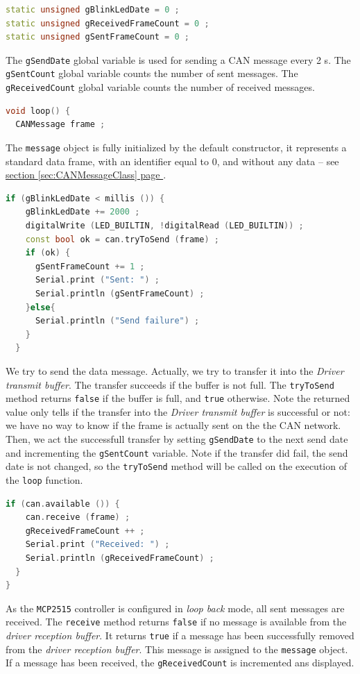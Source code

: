 \documentclass[10pt, a4paper, obeyspaces, openany]{extarticle}
\newcommand\refSectionPage[1]{\hyperref[sec:#1]{section \ref*{sec:#1} page \pageref{sec:#1}}}
\begin{document}
{ \small\begin{lstlisting}[language=c++]
static unsigned gBlinkLedDate = 0 ;
static unsigned gReceivedFrameCount = 0 ;
static unsigned gSentFrameCount = 0 ;
\end{lstlisting}}
The \texttt{gSendDate} global variable is used for sending a CAN message every 2 s. The \texttt{gSentCount} global variable counts the number of sent messages. The \texttt{gReceivedCount} global variable counts the number of received messages.



{ \small\begin{lstlisting}[language=c++]
void loop() {
  CANMessage frame ;
\end{lstlisting}}
The \texttt{message} object is fully initialized by the default constructor, it represents a standard data frame, with an identifier equal to $0$, and without any data -- see \refSectionPage{CANMessageClass}. 







{ \small\begin{lstlisting}[language=c++]
  if (gBlinkLedDate < millis ()) {
    gBlinkLedDate += 2000 ;
    digitalWrite (LED_BUILTIN, !digitalRead (LED_BUILTIN)) ;
    const bool ok = can.tryToSend (frame) ;
    if (ok) {
      gSentFrameCount += 1 ;
      Serial.print ("Sent: ") ;
      Serial.println (gSentFrameCount) ;
    }else{
      Serial.println ("Send failure") ;
    }
  }
\end{lstlisting}}
We try to send the data message. Actually, we try to transfer it into the \emph{Driver transmit buffer}. The transfer succeeds if the buffer is not full. The \texttt{tryToSend} method returns \texttt{false} if the buffer is full, and \texttt{true} otherwise. Note the returned value only tells if the transfer into the \emph{Driver transmit buffer} is successful or not: we have no way to know if the frame is actually sent on the the CAN network. Then, we act the successfull transfer by setting \texttt{gSendDate} to the next send date and incrementing the \texttt{gSentCount} variable. Note if the transfer did fail, the send date is not changed, so the \texttt{tryToSend} method will be called on the execution of the \texttt{loop} function.


{ \small\begin{lstlisting}[language=c++]
  if (can.available ()) {
    can.receive (frame) ;
    gReceivedFrameCount ++ ;
    Serial.print ("Received: ") ;
    Serial.println (gReceivedFrameCount) ;
  }
}
\end{lstlisting}}
As the \texttt{MCP2515} controller is configured in \emph{loop back} mode, all sent messages are received. The \texttt{receive} method returns \texttt{false} if no message is available from the \emph{driver reception buffer}. It returns \texttt{true} if a message has been successfully removed from the \emph{driver reception buffer}. This message is assigned to the \texttt{message} object. If a message has been received, the \texttt{gReceivedCount} is incremented ans displayed.
\end{document}
